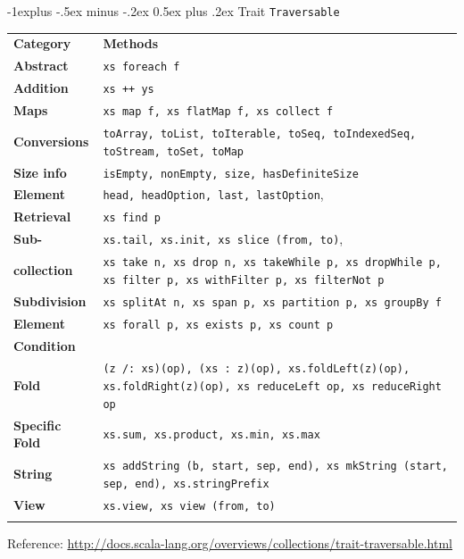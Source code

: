 \documentclass[a4paper,twoside,10pt,landscape]{article}
\makeatletter
\renewcommand{\subsection}{\@startsection{subsection}{2}{0mm}%
                                {-1explus -.5ex minus -.2ex}%
                                {0.5ex plus .2ex}%
                                {\normalfont\normalsize\bfseries}}
\makeatother
\begin{document}
\begin{multicols}{3}
\subsection{Trait \texttt{Traversable}}
\begin{center}
\begin{tabular}{@{}lp{6.5cm}@{}}
\hline\noalign{\smallskip}
\textbf{Category} & \textbf{Methods} \\
\noalign{\smallskip}\hline\noalign{\smallskip}
\textbf{Abstract} & \texttt{xs foreach f}\\
\textbf{Addition} & \texttt{xs ++ ys}\\
\textbf{Maps} & \texttt{xs map f, xs flatMap f, xs collect f}\\
\textbf{Conversions} & \texttt{toArray, toList, toIterable, toSeq, toIndexedSeq, toStream, toSet, toMap}\\
\textbf{Size info} & \texttt{isEmpty, nonEmpty, size, hasDefiniteSize}\\
\textbf{Element} & \texttt{head, headOption, last, lastOption},\\
\textbf{Retrieval} & \texttt{xs find p}\\
\textbf{Sub-} & \texttt{xs.tail, xs.init, xs slice (from, to)},\\
\textbf{collection} & \texttt{xs take n, xs drop n, xs takeWhile p, xs dropWhile p, xs filter p, xs withFilter p, xs filterNot p}\\
\textbf{Subdivision} & \texttt{xs splitAt n, xs span p, xs partition p, xs groupBy f}\\
\textbf{Element} & \texttt{xs forall p, xs exists p, xs count p}\\
\textbf{Condition} & \\
\textbf{Fold} & \texttt{(z /: xs)(op), (xs :\ z)(op), xs.foldLeft(z)(op), xs.foldRight(z)(op), xs reduceLeft op, xs reduceRight op}\\
\textbf{Specific Fold} & \texttt{xs.sum, xs.product, xs.min, xs.max}\\
\textbf{String} & \texttt{xs addString (b, start, sep, end), xs mkString (start, sep, end), xs.stringPrefix}\\
\textbf{View} & \texttt{xs.view, xs view (from, to)}\\
\noalign{\smallskip}\hline
\end{tabular}
Reference: \url{http://docs.scala-lang.org/overviews/collections/trait-traversable.html}
\end{center}



\end{multicols}
\end{document}
